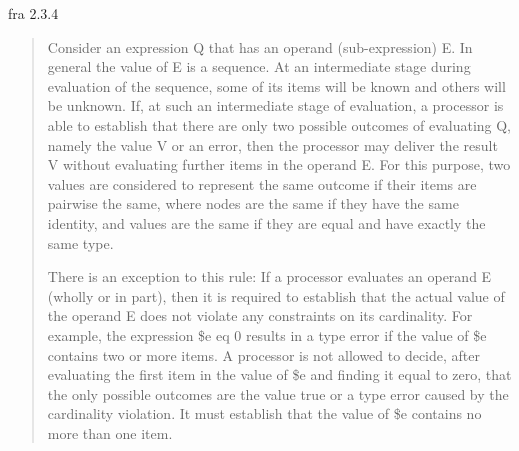 fra 2.3.4 \cite{w3c00}
\begin{quote}
Consider an expression Q that has an operand (sub-expression) E. In general the value of E is a sequence. At an
intermediate stage during evaluation of the sequence, some of its items will be known and others will be unknown.
If, at such an intermediate stage of evaluation, a processor is able to establish that there are only two possible
outcomes of evaluating Q, namely the value V or an error, then the processor may deliver the result V without
evaluating further items in the operand E. For this purpose, two values are considered to represent the same
outcome if their items are pairwise the same, where nodes are the same if they have the same identity, and values
are the same if they are equal and have exactly the same type.

There is an exception to this rule: If a processor evaluates an operand E (wholly or in part), then it is required
to establish that the actual value of the operand E does not violate any constraints on its cardinality. For
example, the expression \$e eq 0 results in a type error if the value of \$e contains two or more items. A processor
is not allowed to decide, after evaluating the first item in the value of \$e and finding it equal to zero, that the
only possible outcomes are the value true or a type error caused by the cardinality violation. It must establish
that the value of \$e contains no more than one item.
\end{quote}

